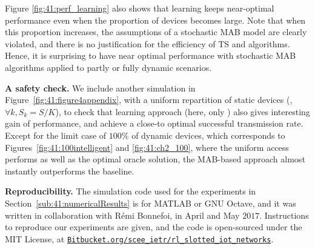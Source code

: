 Figure \ref{fig:41:perf_learning} also shows that learning keeps near-optimal performance even when the proportion of devices becomes large.
Note that when this proportion increases, the assumptions of a stochastic MAB model are clearly violated, and there is no justification for the efficiency of TS and \UCB{} algorithms.
Hence, it is surprising to have near optimal performance with stochastic MAB algorithms applied to partly or fully dynamic scenarios.


\textbf{A safety check.}
%
We include another simulation in Figure~\ref{fig:41:figure4appendix}, with a uniform repartition of static devices (\ie, $\forall k, S_k = S/K$), to check that learning approach (here, only \UCB)
also gives interesting gain of performance, and achieve a close-to optimal successful transmission rate.
Except for the limit case of $100\%$ of dynamic devices, which corresponds to Figures~\ref{fig:41:100intelligent} and \ref{fig:41:ch2_100}, where the uniform access performs as well as the optimal oracle solution, the MAB-based approach almost instantly outperforms the baseline.



\textbf{Reproducibility.}
%
The simulation code used for the experiments in Section~\ref{sub:41:numericalResults} is for MATLAB or GNU Octave,
and it was written in collaboration with Rémi Bonnefoi, in April and May $2017$.
Instructions to reproduce our experiments are given, and
the code is open-sourced under the MIT License, at
\href{https://Bitbucket.org/scee_ietr/rl_slotted_iot_networks}{\texttt{Bitbucket.org/scee\_ietr/rl\_slotted\_iot\_networks}}.
